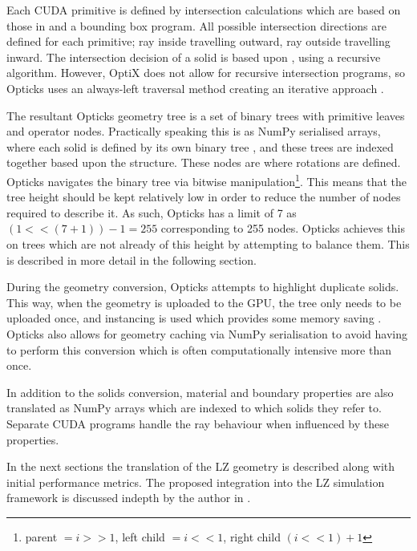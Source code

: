 Each CUDA primitive is defined by intersection calculations which are based on those in \cite{real_time_collision_detection_ref} and a bounding box program.
All possible intersection directions are defined for each primitive; ray inside travelling outward, ray outside travelling inward.
The intersection decision of a solid is based upon \cite{CSG_Intersection_ref}, using a recursive algorithm.
However, OptiX does not allow for recursive intersection programs, so Opticks uses an always-left traversal method creating an iterative approach \cite{Opticks_Paper_2017_ref}.
\par
The resultant Opticks geometry tree is a set of binary trees with primitive leaves and operator nodes.
Practically speaking this is as NumPy serialised arrays, where each solid is defined by its own binary tree \cite{Opticks_Paper_2017_ref}, and these trees are indexed together based upon the structure.
These nodes are where rotations are defined.
Opticks navigates the binary tree via bitwise manipulation\footnote{parent $=i >> 1$, left child $= i << 1$, right child $(i<<1)+1$}.
This means that the tree height should be kept relatively low in order to reduce the number of nodes required to describe it.
As such, Opticks has a limit of 7 as $(1 << (7 + 1)) - 1 = 255$ corresponding to 255 nodes.
Opticks achieves this on trees which are not already of this height by attempting to balance them.
This is described in more detail in the following section.
\par
During the geometry conversion, Opticks attempts to highlight duplicate solids.
This way, when the geometry is uploaded to the GPU, the tree only needs to be uploaded once, and instancing is used which provides some memory saving \cite{Opticks_CHEP_2019_ref}.
Opticks also allows for geometry caching via NumPy serialisation \cite{Opticks_Paper_2017_ref} to avoid having to perform this conversion which is often computationally intensive more than once.
\par
In addition to the solids conversion, material and boundary properties are also translated as NumPy arrays which are indexed to which solids they refer to.
Separate CUDA programs handle the ray behaviour when influenced by these properties.

\par
In the next sections the translation of the LZ geometry is described along with initial performance metrics.
The proposed integration into the LZ simulation framework is discussed indepth by the author in \cite{SEriksen_Opticks_CHEP_2021_ref}.

